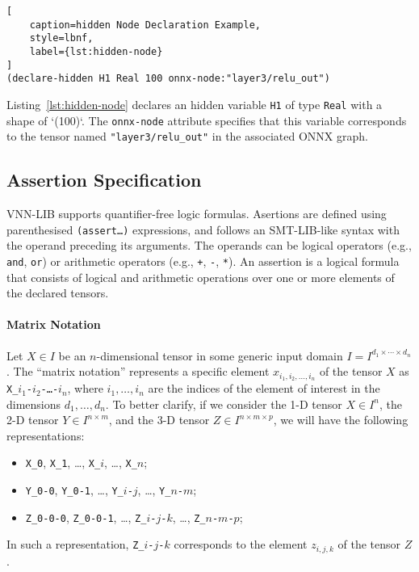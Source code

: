 \begin{lstlisting}[
    caption=hidden Node Declaration Example, 
    style=lbnf,
    label={lst:hidden-node}
]
(declare-hidden H1 Real 100 onnx-node:"layer3/relu_out") 
\end{lstlisting}

Listing~\ref{lst:hidden-node} declares an hidden variable \texttt{H1} of type \texttt{Real} with a shape of `(100)`. The \texttt{onnx-node} attribute 
specifies that this variable corresponds to the tensor named \texttt{"layer3/relu\_out"} in the associated ONNX graph. 

\subsection{Assertion Specification}
VNN-LIB supports quantifier-free logic formulas. Asertions are defined using parenthesised \texttt{(assert\ldots)} expressions, and follows an SMT-LIB-like syntax with the 
operand preceding its arguments. The operands can be logical operators (e.g., \texttt{and}, \texttt{or}) or arithmetic operators (e.g., \texttt{+}, \texttt{-}, \texttt{*}).
An assertion is a logical formula that consists of logical and arithmetic operations over one or more elements of the declared tensors.

\paragraph{Matrix Notation}
Let $X \in I$ be an $n$-dimensional tensor in some generic input domain $I = I^{d_1 \times \cdots \times d_n}$. The ``matrix notation'' represents a specific 
element $x_{i_1, i_2, \dots, i_n}$ of the tensor $X$ as \texttt{X\_$i_1$-$i_2$-\dots-$i_n$}, where $i_1, \dots, i_n$ are the indices of the element of interest in the 
dimensions $d_1, \dots, d_n$. To better clarify, if we consider the 1-D tensor $X \in I^n$, the 2-D tensor $Y \in I^{n \times m}$, and the 3-D tensor 
$Z \in I^{n \times m \times p}$, we will have the following representations:
\begin{itemize}
    \item \texttt{X\_0}, \texttt{X\_1}, \dots, \texttt{X\_$i$}, \dots, \texttt{X\_$n$};
    \item \texttt{Y\_0-0}, \texttt{Y\_0-1}, \dots, \texttt{Y\_$i$-$j$}, \dots, \texttt{Y\_$n$-$m$};
    \item \texttt{Z\_0-0-0}, \texttt{Z\_0-0-1}, \dots, \texttt{Z\_$i$-$j$-$k$}, \dots, \texttt{Z\_$n$-$m$-$p$};
\end{itemize}
In such a representation, \texttt{Z\_$i$-$j$-$k$} corresponds to the element $z_{i,j,k}$ of the tensor $Z$. 

